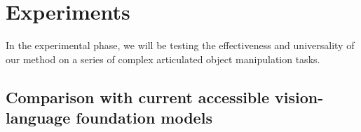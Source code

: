 \documentclass{article}
\begin{document}









\section{Experiments}
In the experimental phase, we will be testing the effectiveness and universality of our method on a series of complex articulated object manipulation tasks.
\subsection{Comparison with current accessible vision-language foundation models}
\end{document}
